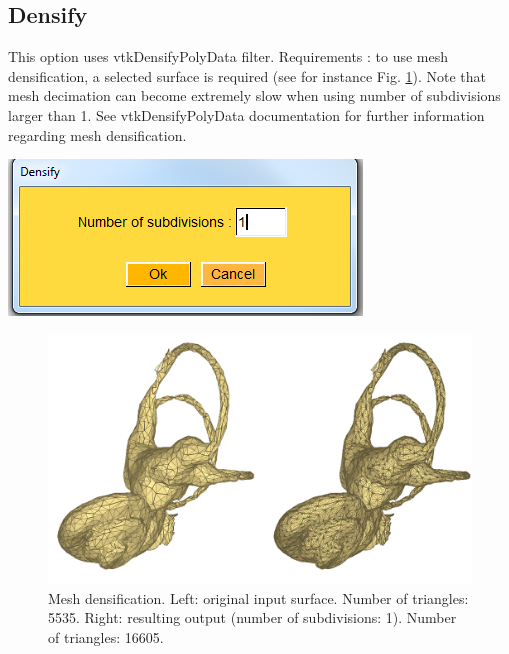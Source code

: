 \subsection{Densify}

\noindent
\begin{minipage}{0.5\textwidth}

This option uses vtkDensifyPolyData filter.
Requirements : to use mesh densification, a selected
surface is required (see for instance Fig. \ref{densify}).
Note that mesh decimation can become extremely slow
when using number of subdivisions larger than 1.
See vtkDensifyPolyData documentation for further information regarding mesh densification.

\end{minipage}    
\begin{minipage}{0.5\textwidth}\centering
  \includegraphics[scale=0.5]{images/Edit_selected_objects/08_densify.png}
 \end{minipage} 
\noindent

\begin{figure}
  \centering
  \includegraphics[scale=0.25]{images/Edit_selected_objects/08_densify_input_output.png} 
	\caption{Mesh densification. Left: original input surface. Number of triangles: 5535. Right: resulting output (number of subdivisions: 1). Number of triangles: 16605.
}
\label{densify}
 
\end{figure}




